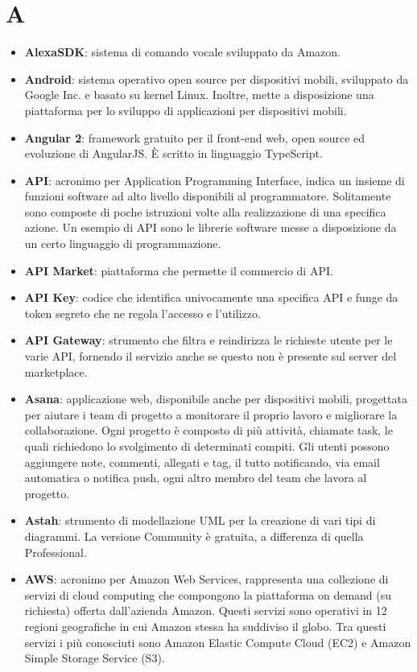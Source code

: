 \section{A}
\begin{itemize}
	\item \textbf{AlexaSDK}: sistema di comando vocale sviluppato da Amazon.
	\item \textbf{Android}: sistema operativo open source per dispositivi mobili, sviluppato da Google Inc. e basato su kernel Linux. Inoltre, mette a disposizione una piattaforma per lo sviluppo di applicazioni per dispositivi mobili.
	\item \textbf{Angular 2}: framework gratuito per il front-end web, open source ed evoluzione di AngularJS. \MakeUppercase{è} scritto in linguaggio TypeScript.
	\item \textbf{API}: acronimo per Application Programming Interface, indica un insieme di funzioni software ad alto livello disponibili al programmatore. Solitamente sono composte di poche istruzioni volte alla realizzazione di una specifica azione. Un esempio di API sono le librerie software messe a disposizione da un certo linguaggio di programmazione.
	\item \textbf{API Market}: piattaforma che permette il commercio di API.
	\item \textbf{API Key}: codice che identifica univocamente una specifica API e funge da token segreto che ne regola l'accesso e l'utilizzo.
	\item \textbf{API Gateway}: strumento che filtra e reindirizza le richieste utente per le varie API, fornendo il servizio anche se questo non è presente sul server del marketplace. 
	\item \textbf{Asana}: applicazione web, disponibile anche per dispositivi mobili, progettata per aiutare i team di progetto a monitorare il proprio lavoro e migliorare la collaborazione. Ogni progetto è composto di più attività, chiamate task, le quali richiedono lo svolgimento di determinati compiti. Gli utenti possono aggiungere note, commenti, allegati e tag, il tutto notificando, via email automatica o notifica push, ogni altro membro del team che lavora al progetto.
	\item \textbf{Astah}: strumento di modellazione UML per la creazione di vari tipi di diagrammi. La versione Community è gratuita, a differenza di quella Professional.
	\item \textbf{AWS}: acronimo per Amazon Web Services, rappresenta una collezione di servizi di cloud computing che compongono la piattaforma on demand (su richiesta) offerta dall'azienda Amazon. Questi servizi sono operativi in 12 regioni geografiche in cui Amazon stessa ha suddiviso il globo. Tra questi servizi i più conosciuti sono Amazon Elastic Compute Cloud (EC2) e Amazon Simple Storage Service (S3).

\end{itemize}
